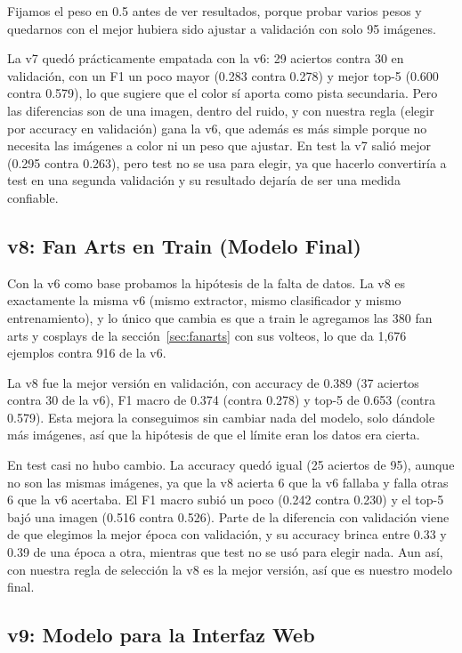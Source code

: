 \documentclass[10pt,twocolumn]{article}
\begin{document}
Fijamos el peso en 0.5 antes de ver resultados, porque probar varios pesos y quedarnos con el mejor hubiera sido ajustar a validación con solo 95 imágenes.

La v7 quedó prácticamente empatada con la v6: 29 aciertos contra 30 en validación, con un F1 un poco mayor (0.283 contra 0.278) y mejor top-5 (0.600 contra 0.579), lo que sugiere que el color sí aporta como pista secundaria. Pero las diferencias son de una imagen, dentro del ruido, y con nuestra regla (elegir por accuracy en validación) gana la v6, que además es más simple porque no necesita las imágenes a color ni un peso que ajustar. En test la v7 salió mejor (0.295 contra 0.263), pero test no se usa para elegir, ya que hacerlo convertiría a test en una segunda validación y su resultado dejaría de ser una medida confiable.

\subsection{v8: Fan Arts en Train (Modelo Final)}

Con la v6 como base probamos la hipótesis de la falta de datos. La v8 es exactamente la misma v6 (mismo extractor, mismo clasificador y mismo entrenamiento), y lo único que cambia es que a train le agregamos las 380 fan arts y cosplays de la sección~\ref{sec:fanarts} con sus volteos, lo que da 1,676 ejemplos contra 916 de la v6.

La v8 fue la mejor versión en validación, con accuracy de 0.389 (37 aciertos contra 30 de la v6), F1 macro de 0.374 (contra 0.278) y top-5 de 0.653 (contra 0.579). Esta mejora la conseguimos sin cambiar nada del modelo, solo dándole más imágenes, así que la hipótesis de que el límite eran los datos era cierta.

En test casi no hubo cambio. La accuracy quedó igual (25 aciertos de 95), aunque no son las mismas imágenes, ya que la v8 acierta 6 que la v6 fallaba y falla otras 6 que la v6 acertaba. El F1 macro subió un poco (0.242 contra 0.230) y el top-5 bajó una imagen (0.516 contra 0.526). Parte de la diferencia con validación viene de que elegimos la mejor época con validación, y su accuracy brinca entre 0.33 y 0.39 de una época a otra, mientras que test no se usó para elegir nada. Aun así, con nuestra regla de selección la v8 es la mejor versión, así que es nuestro modelo final.

\subsection{v9: Modelo para la Interfaz Web}
\end{document}

